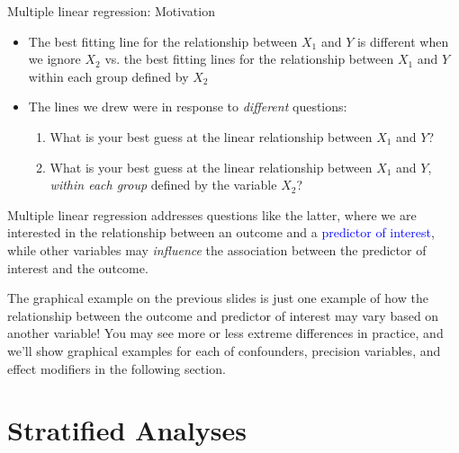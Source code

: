 \documentclass[10pt,t]{beamer}
\begin{document}
\begin{frame}{Multiple linear regression: Motivation}
\begin{itemize}
	\item The best fitting line for the relationship between $X_1$ and $Y$ is different when we ignore $X_2$ vs. the best fitting lines for the relationship between $X_1$ and $Y$ within each group defined by $X_2$
	\item The lines we drew were in response to \textit{different} questions:
	\begin{enumerate}
		\item What is your best guess at the linear relationship between $X_1$ and $Y$?
		\item What is your best guess at the linear relationship between $X_1$ and $Y$, \textit{within each group} defined by the variable $X_2$? 
	\end{enumerate}
\end{itemize}

\vspace{0.3cm}

Multiple linear regression addresses questions like the latter, where we are interested in the relationship between an outcome and a \textcolor{blue}{predictor of interest}, while other variables may \textit{influence} the association between the predictor of interest and the outcome. \pause

\vspace{0.3cm}

\small *The graphical example on the previous slides is just one example of how the relationship between the outcome and predictor of interest may vary based on another variable! You may see more or less extreme differences in practice, and we'll show graphical examples for each of confounders, precision variables, and effect modifiers in the following section.
\end{frame}

\section{Stratified Analyses}
\end{document}

